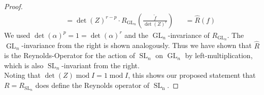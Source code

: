 \begin{proof}
\begin{equation}
\begin{aligned}
      &&&= \operatorname{det} (Z)^{r-p} \cdot R_{\operatorname{GL}_n} \left( \frac{ \tilde{f} }{ \operatorname{det} (Z)^r } \right)
      &&= \hat{R} (f)
    \end{aligned}
  \end{equation}
  We used $ \operatorname{det} (\alpha)^p = 1 = \operatorname{det} (\alpha)^r $ and the $\operatorname{GL}_n$-invariance of $R_{\operatorname{GL}_n}$.
  The $\operatorname{GL}_n$-invariance from the right is shown analogously.
  Thus we have shown that $\hat{R}$ is the Reynolds-Operator for the action of $\operatorname{SL}_n$ on $\operatorname{GL}_n$ by left-multiplication, which is also $\operatorname{SL}_n$-invariant from the right.\\
  Noting that $ \operatorname{det} (Z) \operatorname{mod} I = 1 \operatorname{mod} I $, this shows our proposed statement that $ R = R_{\operatorname{SL}_n} $ does define the Reynolds operator of $\operatorname{\operatorname{SL}_n}$.
\end{proof}

